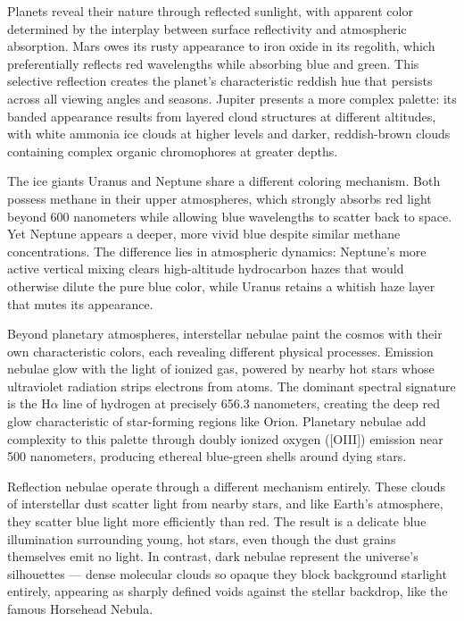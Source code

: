 Planets reveal their nature through reflected sunlight, with apparent color determined by the interplay between surface reflectivity and atmospheric absorption. Mars owes its rusty appearance to iron oxide in its regolith, which preferentially reflects red wavelengths while absorbing blue and green. This selective reflection creates the planet's characteristic reddish hue that persists across all viewing angles and seasons. Jupiter presents a more complex palette: its banded appearance results from layered cloud structures at different altitudes, with white ammonia ice clouds at higher levels and darker, reddish-brown clouds containing complex organic chromophores at greater depths.

The ice giants Uranus and Neptune share a different coloring mechanism. Both possess methane in their upper atmospheres, which strongly absorbs red light beyond 600 nanometers while allowing blue wavelengths to scatter back to space. Yet Neptune appears a deeper, more vivid blue despite similar methane concentrations. The difference lies in atmospheric dynamics: Neptune's more active vertical mixing clears high-altitude hydrocarbon hazes that would otherwise dilute the pure blue color, while Uranus retains a whitish haze layer that mutes its appearance.

Beyond planetary atmospheres, interstellar nebulae paint the cosmos with their own characteristic colors, each revealing different physical processes. Emission nebulae glow with the light of ionized gas, powered by nearby hot stars whose ultraviolet radiation strips electrons from atoms. The dominant spectral signature is the H$\alpha$ line of hydrogen at precisely 656.3 nanometers, creating the deep red glow characteristic of star-forming regions like Orion. Planetary nebulae add complexity to this palette through doubly ionized oxygen ([OIII]) emission near 500 nanometers, producing ethereal blue-green shells around dying stars.

Reflection nebulae operate through a different mechanism entirely. These clouds of interstellar dust scatter light from nearby stars, and like Earth's atmosphere, they scatter blue light more efficiently than red. The result is a delicate blue illumination surrounding young, hot stars, even though the dust grains themselves emit no light. In contrast, dark nebulae represent the universe's silhouettes — dense molecular clouds so opaque they block background starlight entirely, appearing as sharply defined voids against the stellar backdrop, like the famous Horsehead Nebula.

